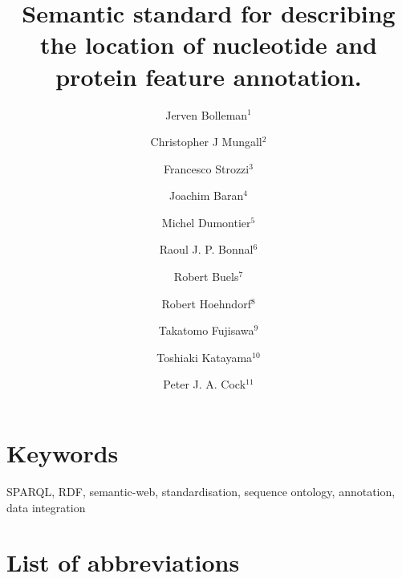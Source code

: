\documentclass[10pt]{bmc_article}
\newenvironment{bmcformat}{\begin{raggedright}\baselineskip20pt\sloppy\setboolean{publ}{false}}{\end{raggedright}\baselineskip20pt\sloppy}
\begin{document}
\begin{bmcformat}
\title{Semantic standard for describing the location of nucleotide and protein feature annotation.}
\author{Jerven Bolleman\correspondingauthor$^{1}$%
    \and Christopher J Mungall$^{2}$%
    \and Francesco Strozzi$^{3}$%
    \and Joachim Baran$^{4}$%
    \and Michel Dumontier$^{5}$%
    \and Raoul J. P. Bonnal$^{6}$%
    \and Robert Buels$^{7}$%
    \and Robert Hoehndorf$^{8}$%
    \and Takatomo Fujisawa$^{9}$%
    \and Toshiaki Katayama$^{10}$%
    \and Peter J. A. Cock$^{11}$%
%
}
\address{
 \iid(1) SIB Swiss Institute of Bioinformatics, Centre Medical Universitaire, 1 rue Michel
Servet, 1211 Geneva 4, Switzerland,
 \iid(2) Genomics Division, Lawrence Berkeley National Laboratory, Berkeley, CA, 94720, US
 \iid(3) CeRSA, Parco Tecnologico Padano, Lodi 26900, Italy, and
 \iid(4) Ontario Institute for Cancer Research, 101 College Street, Suite 800, Toronto, Ontario, M5G 0A3, Canada.
 \iid(5) Stanford Center for Biomedical Informatics Research, 1265 Welch Road, Room X223, Stanford, CA, 94305-5479, US
 \iid(6) Integrative Biology Program, Istituto Nazionale Genetica Molecolare, Milan, Italy,
 \iid(7) University of California, Berkeley, Berkeley, CA, USA,
 \iid(8) Department of Computer Science, Aberystwyth, SY23 3DB, UK,
 \iid(9) Center for Information Biology, National Institute of Genetics, Research Organization of Information and Systems, 1111 Yata, Mishima, Shizuoka 411-08540, Japan,
 \iid(10) Database Center for Life Science, Research Organization of Information and Systems, 2-11-16, Yayoi, Bunkyo-ku, Tokyo, 113-0032, Japan,
 \iid(11) The James Hutton Institute, Dundee, DD2 5DA, UK,
}
\maketitle


\section*{Keywords}
SPARQL, RDF, semantic-web, standardisation, sequence ontology, annotation, data integration









\section*{List of abbreviations}


\end{bmcformat}
\end{document}
